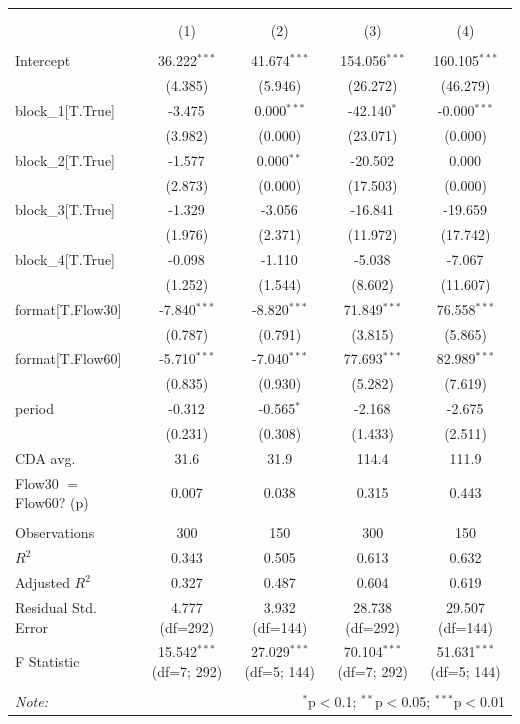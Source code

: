 \begin{table}[!htbp] \centering
\begin{tabular}{@{\extracolsep{5pt}}lcccc}
\\[-1.8ex]\hline
\hline \\[-1.8ex]
\\[-1.8ex] & (1) & (2) & (3) & (4) \\
\hline \\[-1.8ex]
 Intercept & 36.222$^{***}$ & 41.674$^{***}$ & 154.056$^{***}$ & 160.105$^{***}$ \\
& (4.385) & (5.946) & (26.272) & (46.279) \\
 block_1[T.True] & -3.475$^{}$ & 0.000$^{***}$ & -42.140$^{*}$ & -0.000$^{***}$ \\
& (3.982) & (0.000) & (23.071) & (0.000) \\
 block_2[T.True] & -1.577$^{}$ & 0.000$^{**}$ & -20.502$^{}$ & 0.000$^{}$ \\
& (2.873) & (0.000) & (17.503) & (0.000) \\
 block_3[T.True] & -1.329$^{}$ & -3.056$^{}$ & -16.841$^{}$ & -19.659$^{}$ \\
& (1.976) & (2.371) & (11.972) & (17.742) \\
 block_4[T.True] & -0.098$^{}$ & -1.110$^{}$ & -5.038$^{}$ & -7.067$^{}$ \\
& (1.252) & (1.544) & (8.602) & (11.607) \\
 format[T.Flow30] & -7.840$^{***}$ & -8.820$^{***}$ & 71.849$^{***}$ & 76.558$^{***}$ \\
& (0.787) & (0.791) & (3.815) & (5.865) \\
 format[T.Flow60] & -5.710$^{***}$ & -7.040$^{***}$ & 77.693$^{***}$ & 82.989$^{***}$ \\
& (0.835) & (0.930) & (5.282) & (7.619) \\
 period & -0.312$^{}$ & -0.565$^{*}$ & -2.168$^{}$ & -2.675$^{}$ \\
& (0.231) & (0.308) & (1.433) & (2.511) \\
 CDA avg. & 31.6 & 31.9 & 114.4 & 111.9 \\
 Flow30 $=$ Flow60? (p) & 0.007 & 0.038 & 0.315 & 0.443 \\
\hline \\[-1.8ex]
 Observations & 300 & 150 & 300 & 150 \\
 $R^2$ & 0.343 & 0.505 & 0.613 & 0.632 \\
 Adjusted $R^2$ & 0.327 & 0.487 & 0.604 & 0.619 \\
 Residual Std. Error & 4.777 (df=292) & 3.932 (df=144) & 28.738 (df=292) & 29.507 (df=144) \\
 F Statistic & 15.542$^{***}$ (df=7; 292) & 27.029$^{***}$ (df=5; 144) & 70.104$^{***}$ (df=7; 292) & 51.631$^{***}$ (df=5; 144) \\
\hline
\hline \\[-1.8ex]
\textit{Note:} & \multicolumn{4}{r}{$^{*}$p$<$0.1; $^{**}$p$<$0.05; $^{***}$p$<$0.01} \\
\end{tabular}
\end{table}